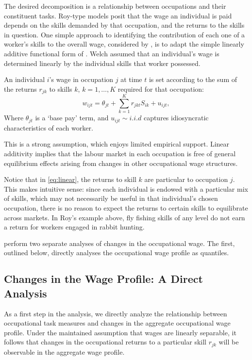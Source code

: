 The desired decomposition is a relationship between occupations and their constituent tasks. Roy-type models posit that the wage an individual is paid depends on the skills demanded by that occupation, and the returns to the skills in question. One simple approach to identifying the contribution of each one of a worker's skills to the overall wage, considered by \citet{Firpo2011}, is to adapt the simple linearly additive functional form of \citet{Welch1969}. Welch assumed that an individual's wage is determined linearly by the individual skills that worker possessed.
\begin{assumption} \label{ass:linear}
  An individual $i$'s wage in occupation $j$ at time $t$ is set according to the sum of the returns $r_{jk}$ to skills $k$, $k=1,\dots,K$ required for that occupation:
\begin{equation}
  w_{ijt} = \theta_{jt} + \sum_{k=1}^K r_{jkt}S_{ik} + u_{ijt}, \label{eq:linear}
\end{equation}
Where $\theta_{jt}$ is a `base pay' term, and $u_{ijt}\sim i.i.d$ captures idiosyncratic characteristics of each worker. 
\end{assumption}

This is a strong assumption, which enjoys limited empirical support. Linear additivity implies that the labour market in each occupation is free of general equilibrium effects arising from changes in other occupational wage structures.

Notice that in \eqref{eq:linear}, the returns to skill $k$ are particular to occupation $j$. This makes intuitive sense: since each individual is endowed with a particular mix of skills, which may not necessarily be useful in that individual's chosen occupation, there is no reason to expect the returns to certain skills to equilibrate across markets. In Roy's example above, fly fishing skills of any level do not earn a return for workers engaged in rabbit hunting. %

\citet{Firpo2011} perform two separate analyses of changes in the occupational wage. The first, outlined below, directly analyses the occupational wage profile as quantiles.

\subsection{Changes in the Wage Profile: A Direct Analysis} 

As a first step in the analysis, we directly analyze the relationship between occupational task measures and changes in the aggregate occupational wage profile. Under the maintained assumption that wages are linearly separable, it follows that changes in the occupational returns to a particular skill $r_{jk}$ will be observable in the aggregate wage profile.

